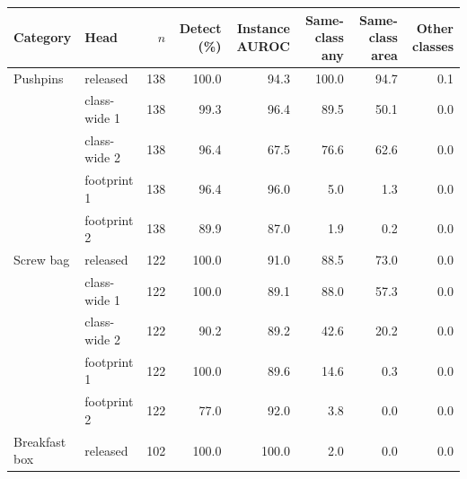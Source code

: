\begin{tabular}{llrrrrrr}
\toprule
Category & Head & $n$ & Detect (\%) & Instance AUROC & Same-class any & Same-class area & Other classes \\
\midrule
Pushpins & released & 138 & 100.0 & 94.3 & 100.0 & 94.7 & 0.1 \\
 & class-wide 1 & 138 & 99.3 & 96.4 & 89.5 & 50.1 & 0.0 \\
 & class-wide 2 & 138 & 96.4 & 67.5 & 76.6 & 62.6 & 0.0 \\
 & footprint 1 & 138 & 96.4 & 96.0 & 5.0 & 1.3 & 0.0 \\
 & footprint 2 & 138 & 89.9 & 87.0 & 1.9 & 0.2 & 0.0 \\
\midrule
Screw bag & released & 122 & 100.0 & 91.0 & 88.5 & 73.0 & 0.0 \\
 & class-wide 1 & 122 & 100.0 & 89.1 & 88.0 & 57.3 & 0.0 \\
 & class-wide 2 & 122 & 90.2 & 89.2 & 42.6 & 20.2 & 0.0 \\
 & footprint 1 & 122 & 100.0 & 89.6 & 14.6 & 0.3 & 0.0 \\
 & footprint 2 & 122 & 77.0 & 92.0 & 3.8 & 0.0 & 0.0 \\
\midrule
Breakfast box & released & 102 & 100.0 & 100.0 & 2.0 & 0.0 & 0.0 \\
\bottomrule
\end{tabular}
